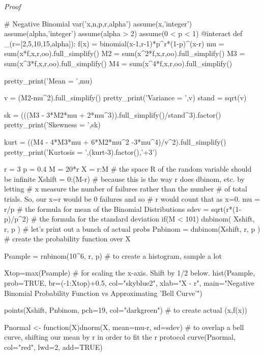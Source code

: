 \documentclass[10pt,]{book}
\makeatletter
\renewcommand*{\proofname}{Proof}
\renewenvironment{proof}[1][\proofname]{\par
  \pushQED{\qed}%
  \normalfont \topsep6\p@\@plus6\p@\relax
  \trivlist
  \item\relax
    {\itshape
    #1\@addpunct{.}}\hspace\labelsep\ignorespaces
}{%
  \popQED\endtrivlist\@endpefalse
}
\numberwithin{equation}{section}
\makeatother
\begin{document}
\begin{proof}\hypertarget{proof-52}{}
\end{proof}
%
\par
\hypertarget{p-1005}{}%
\leavevmode%
\begin{sageinput}
# Negative Binomial
var('x,n,p,r,alpha')
assume(x,'integer')
assume(alpha,'integer')
assume(alpha > 2)
assume(0 < p < 1)
@interact
def _(r=[2,5,10,15,alpha]):
    f(x) = binomial(x-1,r-1)*p^r*(1-p)^(x-r)
    mu = sum(x*f,x,r,oo).full_simplify()
    M2 = sum(x^2*f,x,r,oo).full_simplify()
    M3 = sum(x^3*f,x,r,oo).full_simplify()
    M4 = sum(x^4*f,x,r,oo).full_simplify()
        
    pretty_print('Mean = ',mu)
    
    v = (M2-mu^2).full_simplify()
    pretty_print('Variance = ',v)
    stand = sqrt(v)
    
    sk = (((M3 - 3*M2*mu + 2*mu^3)).full_simplify()/stand^3).factor()
    pretty_print('Skewness = ',sk)
    
    kurt = ((M4 - 4*M3*mu + 6*M2*mu^2 -3*mu^4)/v^2).full_simplify()
    pretty_print('Kurtosis = ',(kurt-3).factor(),'+3')
\end{sageinput}
%
\par
\hypertarget{p-1006}{}%
\leavevmode%
\begin{sageinput}
r = 3
p = 0.4
M = 20*r
X = r:M    # the space R of the random variable should be infinite 
Xshift = 0:(M-r)   # because this is the way r does dbinom, etc. by letting
                   # x measure the number of failures rather than the number
                   # of total trials.  So, our x=r would be 0 failures and so
                   # r would count that as x=0.
mu = r/p      # the formula for mean of the Binomial Distributions
sdev = sqrt(r*(1-p)/p^2)  # the formula for the standard deviation
if(M < 101){
dnbinom( Xshift, r, p )   # let's print out a bunch of actual probs
}
Pnbinom = dnbinom(Xshift, r, p )  # create the probability function over X

Psample = rnbinom(10^6, r, p)  # to create a histogram, sample a lot

Xtop=max(Psample)          # for scaling the x-axis. Shift by 1/2 below.
hist(Psample, prob=TRUE, br=(-1:Xtop)+0.5, col="skyblue2", xlab="X - r", 
  main="Negative Binomial Probability Function vs Approximating 'Bell Curve'")

points(Xshift, Pnbinom, pch=19, col="darkgreen")  # to create actual (x,f(x))

Pnormal <- function(X){dnorm(X, mean=mu-r, sd=sdev)}   
# to overlap a bell curve, shifting our mean by r in order to fit the r protocol
curve(Pnormal, col="red", lwd=2, add=TRUE)
\end{sageinput}
%
%
%
\typeout{************************************************}
\typeout{************************************************}
%
\end{document}
